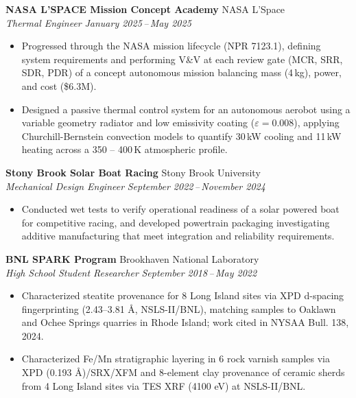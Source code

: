 \documentclass[11pt]{article}
\begin{document}
\vspace{2pt}

\noindent\textbf{NASA L'SPACE Mission Concept Academy} \hfill NASA L'Space\\
\textit{Thermal Engineer} \hfill \textit{January 2025\,--\,May 2025}
\begin{itemize}[leftmargin=10pt,itemsep=0pt,parsep=0pt,topsep=2pt,label=\textbullet]
\item Progressed through the NASA mission lifecycle (NPR 7123.1), defining system requirements and performing V\&V at each review gate (MCR, SRR, SDR, PDR) of a concept autonomous mission balancing mass (4\,kg), power, and cost (\$6.3M).
\item Designed a passive thermal control system for an autonomous aerobot using a variable geometry radiator and low emissivity coating ($\varepsilon = 0.008$), applying Churchill-Bernstein convection models to quantify 30\,kW cooling and 11\,kW heating across a 350 -- 400\,K atmospheric profile.
\end{itemize}

\vspace{2pt}

\noindent\textbf{Stony Brook Solar Boat Racing} \hfill Stony Brook University\\
\textit{Mechanical Design Engineer} \hfill \textit{September 2022\,--\,November 2024}
\begin{itemize}[leftmargin=10pt,itemsep=0pt,parsep=0pt,topsep=2pt,label=\textbullet]
\item Conducted wet tests to verify operational readiness of a solar powered boat for competitive racing, and developed powertrain packaging investigating additive manufacturing that meet integration and reliability requirements.
\end{itemize}

\vspace{2pt}

\noindent\textbf{BNL SPARK Program} \hfill Brookhaven National Laboratory\\
\textit{High School Student Researcher} \hfill \textit{September 2018\,--\,May 2022}
\begin{itemize}[leftmargin=10pt,itemsep=0pt,parsep=0pt,topsep=2pt,label=\textbullet]
\item Characterized steatite provenance for 8 Long Island sites via XPD d-spacing fingerprinting (2.43–3.81 Å, NSLS-II/BNL), matching samples to Oaklawn and Ochee Springs quarries in Rhode Island; work cited in NYSAA Bull. 138, 2024.
\item Characterized Fe/Mn stratigraphic layering in 6 rock varnish samples via XPD (0.193 Å)/SRX/XFM and 8-element clay provenance of ceramic sherds from 4 Long Island sites via TES XRF (4100 eV) at NSLS-II/BNL.
\end{itemize}
\end{document}

